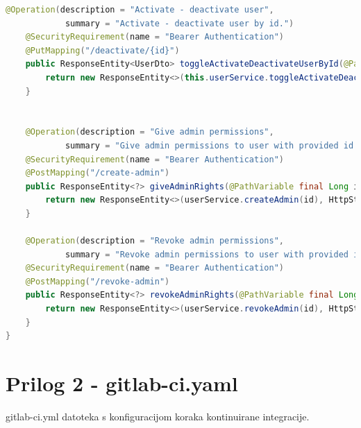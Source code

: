 \documentclass[a4paper,12pt,oneside]{article}
\begin{document}
\begin{lstlisting}[language=Java]
    @Operation(description = "Activate - deactivate user",
            summary = "Activate - deactivate user by id.")
    @SecurityRequirement(name = "Bearer Authentication")
    @PutMapping("/deactivate/{id}")
    public ResponseEntity<UserDto> toggleActivateDeactivateUserById(@PathVariable final Long id) {
        return new ResponseEntity<>(this.userService.toggleActivateDeactivate(id), HttpStatus.OK);
    }


    @Operation(description = "Give admin permissions",
            summary = "Give admin permissions to user with provided id. Requires Admin rights.")
    @SecurityRequirement(name = "Bearer Authentication")
    @PostMapping("/create-admin")
    public ResponseEntity<?> giveAdminRights(@PathVariable final Long id) {
        return new ResponseEntity<>(userService.createAdmin(id), HttpStatus.OK);
    }

    @Operation(description = "Revoke admin permissions",
            summary = "Revoke admin permissions to user with provided id. Requires Admin rights.")
    @SecurityRequirement(name = "Bearer Authentication")
    @PostMapping("/revoke-admin")
    public ResponseEntity<?> revokeAdminRights(@PathVariable final Long id) {
        return new ResponseEntity<>(userService.revokeAdmin(id), HttpStatus.OK);
    }
}

\end{lstlisting}


\newpage
\section*{Prilog 2 - gitlab-ci.yaml}
\label{prilog 2}
gitlab-ci.yml datoteka s konfiguracijom koraka kontinuirane integracije.
\end{document}
